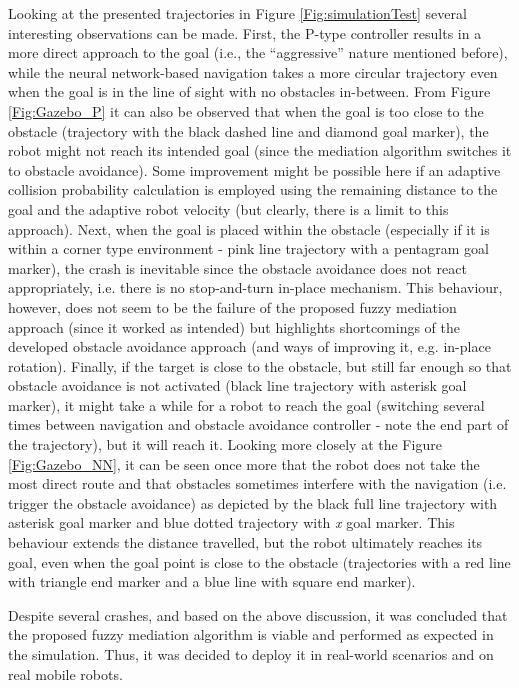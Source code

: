 Looking at the presented trajectories in Figure \ref{Fig:simulationTest} several interesting observations can be made. First, the P-type controller results in a more direct approach to the goal (i.e., the ``aggressive'' nature mentioned before), while the neural network-based navigation takes a more circular trajectory even when the goal is in the line of sight with no obstacles in-between. From Figure \ref{Fig:Gazebo_P} it can also be observed that when the goal is too close to the obstacle (trajectory with the black dashed line and diamond goal marker), the robot might not reach its intended goal (since the mediation algorithm switches it to obstacle avoidance). Some improvement might be possible here if an adaptive collision probability calculation is employed using the remaining distance to the goal and the adaptive robot velocity (but clearly, there is a limit to this approach). Next, when the goal is placed within the obstacle (especially if it is within a corner type environment - pink line trajectory with a pentagram goal marker), the crash is inevitable since the obstacle avoidance does not react appropriately, i.e. there is no stop-and-turn in-place mechanism. This behaviour, however, does not seem to be the failure of the proposed fuzzy mediation approach (since it worked as intended) but highlights shortcomings of the developed obstacle avoidance approach (and ways of improving it, e.g. in-place rotation). Finally, if the target is close to the obstacle, but still far enough so that obstacle avoidance is not activated (black line trajectory with asterisk goal marker), it might take a while for a robot to reach the goal (switching several times between navigation and obstacle avoidance controller - note the end part of the trajectory), but it will reach it. Looking more closely at the Figure \ref{Fig:Gazebo_NN}, it can be seen once more that the robot does not take the most direct route and that obstacles sometimes interfere with the navigation (i.e. trigger the obstacle avoidance) as depicted by the black full line trajectory with asterisk goal marker and blue dotted trajectory with \emph{x} goal marker. This behaviour extends the distance travelled, but the robot ultimately reaches its goal, even when the goal point is close to the obstacle (trajectories with a red line with triangle end marker and a blue line with square end marker).

Despite several crashes, and based on the above discussion, it was concluded that the proposed fuzzy mediation algorithm is viable and performed as expected in the simulation. Thus, it was decided to deploy it in real-world scenarios and on real mobile robots.


